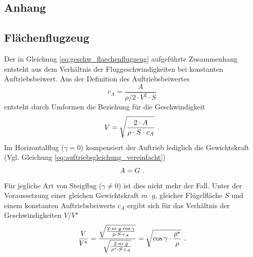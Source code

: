 \begin{appendix}
\chapter{Anhang}
\label{chap:anhang}

\section{Flächenflugzeug}
Der in Gleichung \ref{eq:geschw_flaechenflugzeug} aufgeführte Zusammenhang entsteht aus dem Verhältnis der Fluggeschwindigkeiten bei konstanten Auftriebsbeiwert. Aus der Definition des Auftriebsbeiwertes
\begin{equation}
	c_{A} = \frac{A}{\rho/2\cdot V^2\cdot S}
\end{equation}
entsteht durch Umformen die Beziehung für die Geschwindigkeit
\begin{equation}
	V = \sqrt{\frac{2\cdot A}{\rho\cdot S \cdot c_{A}}} ~\text{.}
\end{equation}
Im Horizontalflug (\ensuremath{\gamma = 0}) kompensiert der Auftrieb lediglich die Gewichtskraft (Vgl. Gleichung \ref{eq:auftriebsgleichung_vereinfacht})
\begin{equation}
	A = G ~\text{.}
\end{equation}
Für jegliche Art von Steigflug (\ensuremath{\gamma \neq 0}) ist dies nicht mehr der Fall. Unter der Voraussetzung einer gleichen Gewichtskraft \ensuremath{m\cdot g}, gleicher Flügelfläche \ensuremath{S} und einem konstanten Auftriebsbeiwerts \ensuremath{c_{A}} ergibt sich für das Verhältnis der Geschwindigkeiten \ensuremath{V/V^\star}
\begin{equation}
	\frac{V}{V^\star} = \frac{\sqrt{\frac{2\cdot m \cdot g\cdot \cos\gamma}{\rho\cdot S \cdot c_{A}}}}{\sqrt{\frac{2\cdot m\cdot g}{\rho^\star \cdot S \cdot c_{A}}}} = \sqrt{\cos\gamma\cdot\frac{\rho^\star}{\rho}} ~\text{.}
\end{equation}\\


\end{appendix}
